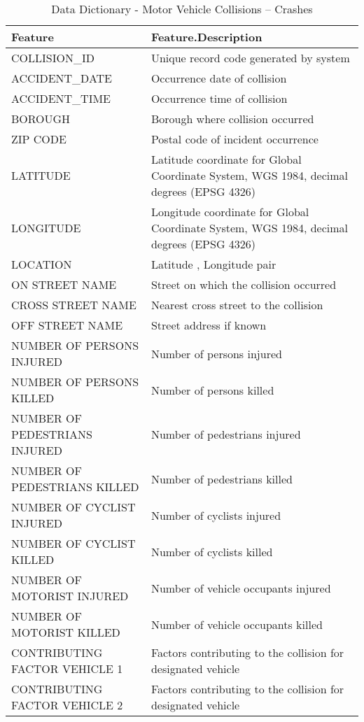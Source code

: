 \begin{table}

\caption{\label{tab:unnamed-chunk-1}Data Dictionary - Motor Vehicle Collisions – Crashes}
\centering
\begin{tabular}[t]{l|l}
\hline
Feature & Feature.Description\\
\hline
COLLISION\_ID & Unique record code generated by system\\
\hline
ACCIDENT\_DATE & Occurrence date of collision\\
\hline
ACCIDENT\_TIME & Occurrence time of collision\\
\hline
BOROUGH & Borough where collision occurred\\
\hline
ZIP CODE & Postal code of incident occurrence\\
\hline
LATITUDE & Latitude coordinate for Global Coordinate System, WGS 1984, decimal degrees (EPSG 4326)\\
\hline
LONGITUDE & Longitude coordinate for Global Coordinate System, WGS 1984, decimal degrees (EPSG 4326)\\
\hline
LOCATION & Latitude , Longitude pair\\
\hline
ON STREET NAME & Street on which the collision occurred\\
\hline
CROSS STREET NAME & Nearest cross street to the collision\\
\hline
OFF STREET NAME & Street address if known\\
\hline
NUMBER OF PERSONS INJURED & Number of persons injured\\
\hline
NUMBER OF PERSONS KILLED & Number of persons killed\\
\hline
NUMBER OF PEDESTRIANS INJURED & Number of pedestrians injured\\
\hline
NUMBER OF PEDESTRIANS KILLED & Number of pedestrians killed\\
\hline
NUMBER OF CYCLIST INJURED & Number of cyclists injured\\
\hline
NUMBER OF CYCLIST KILLED & Number of cyclists killed\\
\hline
NUMBER OF MOTORIST INJURED & Number of vehicle occupants injured\\
\hline
NUMBER OF MOTORIST KILLED & Number of vehicle occupants killed\\
\hline
CONTRIBUTING FACTOR VEHICLE 1 & Factors contributing to the collision for designated vehicle\\
\hline
CONTRIBUTING FACTOR VEHICLE 2 & Factors contributing to the collision for designated vehicle\\

\end{tabular}
\end{table}
